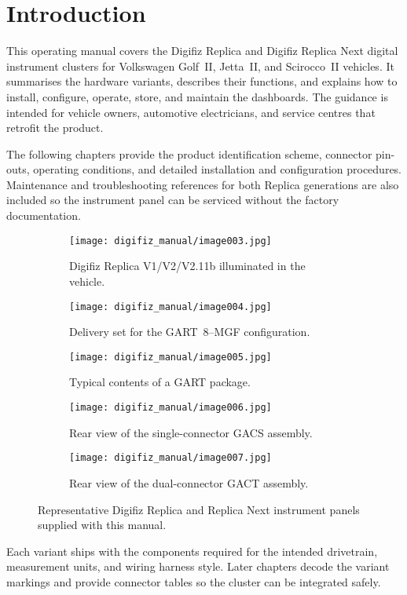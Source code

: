 \chapter{Introduction}\label{ch:introduction}

This operating manual covers the Digifiz Replica and Digifiz Replica Next digital instrument clusters for Volkswagen Golf~II, Jetta~II, and Scirocco~II vehicles. It summarises the hardware variants, describes their functions, and explains how to install, configure, operate, store, and maintain the dashboards. The guidance is intended for vehicle owners, automotive electricians, and service centres that retrofit the product.

The following chapters provide the product identification scheme, connector pin-outs, operating conditions, and detailed installation and configuration procedures. Maintenance and troubleshooting references for both Replica generations are also included so the instrument panel can be serviced without the factory documentation.

\begin{figure}[htbp]
    \centering
    \begin{subfigure}{0.48\textwidth}
        \texttt{[image: digifiz\_manual/image003.jpg]}
        \caption{Digifiz Replica V1/V2/V2.11b illuminated in the vehicle.}
    \end{subfigure}\hfill
    \begin{subfigure}{0.48\textwidth}
        \texttt{[image: digifiz\_manual/image004.jpg]}
        \caption{Delivery set for the GART~8--MGF configuration.}
    \end{subfigure}
    \begin{subfigure}{0.48\textwidth}
        \texttt{[image: digifiz\_manual/image005.jpg]}
        \caption{Typical contents of a GART package.}
    \end{subfigure}\hfill
    \begin{subfigure}{0.48\textwidth}
        \texttt{[image: digifiz\_manual/image006.jpg]}
        \caption{Rear view of the single-connector GACS assembly.}
    \end{subfigure}
    \begin{subfigure}{0.48\textwidth}
        \texttt{[image: digifiz\_manual/image007.jpg]}
        \caption{Rear view of the dual-connector GACT assembly.}
    \end{subfigure}
    \caption{Representative Digifiz Replica and Replica Next instrument panels supplied with this manual.}
\end{figure}

Each variant ships with the components required for the intended drivetrain, measurement units, and wiring harness style. Later chapters decode the variant markings and provide connector tables so the cluster can be integrated safely.
